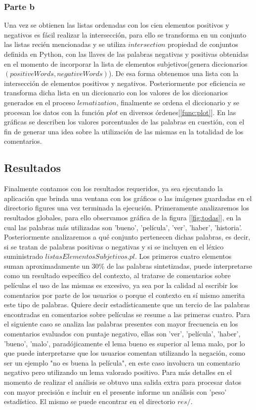 \documentclass[12pt]{article}
\begin{document}
\subsubsection{Parte b}
Una vez se obtienen las listas ordenadas con los cien elementos positivos y negativos es fácil realizar la intersección, para ello se transforma en un conjunto las listas recién mencionadas y se utiliza $intersection$ propiedad de conjuntos definida en Python, con las llaves de las palabras negativas y positivas obtenidas en el momento de incorporar la lista de elementos subjetivos(genera diccionarios $(positiveWords, negativeWords)$). De esa forma obtenemos una lista con la intersección de elementos positivos y negativos.
Posteriormente por eficiencia se transforma dicha lista en un diccionario con los valores de los diccionarios generados en el proceso $lematization$, finalmente se ordena el diccionario y se procesan los datos con la función $plot$ en diversos órdenes[\ref{func:plot}].
En las gráficas se describen los valores porcentuales de las palabras en cuestión, con el fin de generar una idea sobre la utilización de las mismas en la totalidad de los comentarios.



\subsection{Resultados}
Finalmente contamos con los resultados requeridos, ya sea ejecutando la aplicación que brinda una ventana con los gráficos o las imágenes guardadas en el directorio figures una vez terminada la ejecución.
Primeramente analizaremos los resultados globales, para ello observamos gráfica de la figura [\ref{fig:todas}], en la cual las palabras más utilizadas son 'bueno', 'película', 'ver', 'haber', 'historia'. Posteriormente analizaremos a qué conjunto pertenecen dichas palabras, es decir, si se tratan de palabras positivas o negativas y si se incluyen en el léxico suministrado $listasElementosSubjetivos.pl$. Los primeros cuatro elementos suman aproximadamente un $30 \%$ de las palabras sintetizadas, puede interpretarse como un resultado específico del contexto, al tratarse de comentarios sobre películas el uso de las mismas es excesivo, ya sea por la calidad al escribir los comentarios por parte de los usuarios o porque el contexto en sí mismo amerita este tipo de palabras. Quiere decir estadísticamente que un tercio de las palabras encontradas en comentarios sobre películas se resume a las primeras cuatro.
Para el siguiente caso se analiza las palabras presentes con mayor frecuencia en los comentarios evaluados con puntaje negativo, ellas son 'ver', 'película', 'haber', 'bueno', 'malo', paradójicamente el lema bueno es superior al lema malo, por lo que puede interpretarse que los usuarios comentan utilizando la negación, como ser un ejemplo "no es buena la película", en este caso involucra un comentario negativo pero utilizando un lema valorado positivo. Para más detalles en el momento de realizar el análisis se obtuvo una salida extra para procesar datos con mayor precisión e incluir en el presente informe un análisis con 'peso' estadístico. El mismo se puede encontrar en el directorio $res/$.
\end{document}
